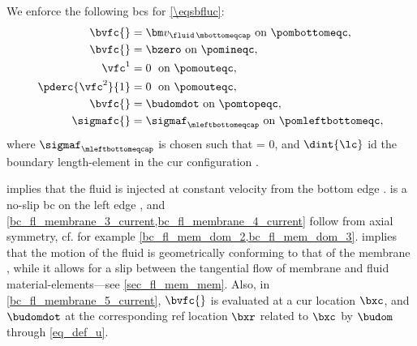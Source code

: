 We enforce the following \acp{bc} for \cref{\eqsbfluc}:
\begin{align}
    \label{bc_fl_membrane_1_current}
    \bvfc{}           & =  \vfbottom  \text{ on } \pombottomeqc,            \\
    \label{bc_fl_membrane_2_current}
    \bvfc{}           & =  \bzero  \text{ on } \pomineqc,                   \\
    \label{bc_fl_membrane_3_current}
    \vfc^1            & =  0 \; \text{ on } \pomouteqc ,                    \\
    \label{bc_fl_membrane_4_current}
    \pderc{\vfc^2}{1} & =  0 \; \text{ on } \pomouteqc ,                    \\
    \label{bc_fl_membrane_5_current}
    \bvfc{}           & = \budomdot  \text{ on } \pomtopeqc,                \\
    \label{bc_fl_membrane_6_current}
    \sigmafc{}        & = \sigmafleftbottomc \text{ on } \pomleftbottomeqc,
\end{align}
where $\sigmafleftbottomc$ is chosen such that
\be\label{bc_fl_membrane_7_current}
\rhof {} = 0,
\ee
and $\dint{\lc}$ id the boundary length-element in the \ac{cur} configuration \cite{kamenskyLectureNotesMAE}.




 implies that the fluid is injected at constant velocity from the bottom edge \pombottomc.   is a no-slip \ac{bc} on the left edge \pominc, and \cref{bc_fl_membrane_3_current,bc_fl_membrane_4_current} follow from axial symmetry, cf. for example \cref{bc_fl_mem_dom_2,bc_fl_mem_dom_3}.
 implies that the motion of the fluid is geometrically conforming to that of the membrane   \cite{kamenskyLectureNotesMAE}, while it allows for a slip between the tangential flow of membrane and fluid material-elements---see \cref{sec_fl_mem_mem}. Also, in \cref{bc_fl_membrane_5_current}, $\bvfc{}$ is evaluated at a \ac{cur} location $\bxc$, and $\budomdot$ at the corresponding \ac{ref} location $\bxr$ related to $\bxc$ by $\budom$ through \cref{eq_def_u}.
%

